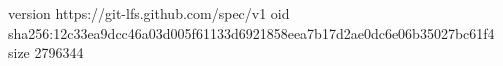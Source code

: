 version https://git-lfs.github.com/spec/v1
oid sha256:12c33ea9dcc46a03d005f61133d6921858eea7b17d2ae0dc6e06b35027bc61f4
size 2796344
